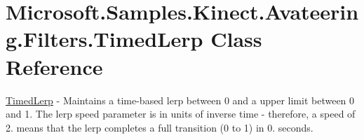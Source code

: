\hypertarget{class_microsoft_1_1_samples_1_1_kinect_1_1_avateering_1_1_filters_1_1_timed_lerp}{\section{Microsoft.\+Samples.\+Kinect.\+Avateering.\+Filters.\+Timed\+Lerp Class Reference}
\label{class_microsoft_1_1_samples_1_1_kinect_1_1_avateering_1_1_filters_1_1_timed_lerp}
}


\hyperlink{class_microsoft_1_1_samples_1_1_kinect_1_1_avateering_1_1_filters_1_1_timed_lerp}{Timed\+Lerp} -\/ Maintains a time-\/based lerp between 0 and a upper limit between 0 and 1. The lerp speed parameter is in units of inverse time -\/ therefore, a speed of 2. means that the lerp completes a full transition (0 to 1) in 0. seconds.  



